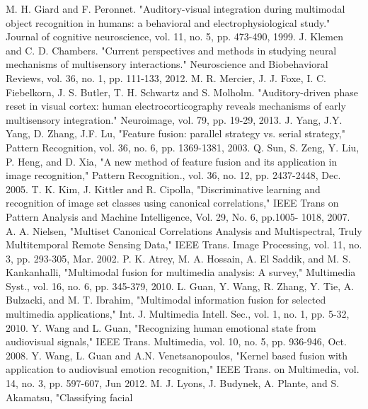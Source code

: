 \documentclass[10pt,journal,compsoc]{IEEEtran}
\begin{document}
\begin{thebibliography}{1}

M. H. Giard and F. Peronnet. "Auditory-visual integration during multimodal object recognition in humans: a behavioral and electrophysiological study." Journal of cognitive neuroscience, vol. 11, no. 5, pp. 473-490, 1999.
J. Klemen and C. D. Chambers. "Current perspectives and methods in studying neural mechanisms of multisensory interactions." Neuroscience and Biobehavioral Reviews, vol. 36, no. 1, pp. 111-133, 2012.
M. R. Mercier, J. J. Foxe, I. C. Fiebelkorn, J. S. Butler, T. H. Schwartz and S. Molholm. "Auditory-driven phase reset in visual cortex: human electrocorticography reveals mechanisms of early multisensory integration." Neuroimage, vol. 79, pp. 19-29, 2013.
J. Yang, J.Y. Yang, D. Zhang, J.F. Lu, "Feature fusion: parallel strategy
vs. serial strategy," Pattern Recognition, vol. 36, no. 6, pp. 1369-1381, 2003.
Q. Sun, S. Zeng, Y. Liu, P. Heng, and D. Xia, "A new method of feature
fusion and its application in image recognition," Pattern Recognition., vol.
36, no. 12, pp. 2437-2448, Dec. 2005.
T. K. Kim, J. Kittler and R. Cipolla, "Discriminative learning and
recognition of image set classes using canonical correlations," IEEE Trans
on Pattern Analysis and Machine Intelligence, Vol. 29, No. 6, pp.1005-
1018, 2007.
A. A. Nielsen, "Multiset Canonical Correlations Analysis and Multispectral,
Truly Multitemporal Remote Sensing Data," IEEE Trans. Image
Processing, vol. 11, no. 3, pp. 293-305, Mar. 2002.
P. K. Atrey, M. A. Hossain, A. El Saddik, and M. S. Kankanhalli,
"Multimodal fusion for multimedia analysis: A survey," Multimedia Syst.,
vol. 16, no. 6, pp. 345-379, 2010.
L. Guan, Y. Wang, R. Zhang, Y. Tie, A. Bulzacki, and M. T. Ibrahim,
"Multimodal information fusion for selected multimedia applications,"
Int. J. Multimedia Intell. Sec., vol. 1, no. 1, pp. 5-32, 2010.
Y. Wang and L. Guan, "Recognizing human emotional state from audiovisual
signals," IEEE Trans. Multimedia, vol. 10, no. 5, pp. 936-946, Oct.
2008.
Y. Wang, L. Guan and A.N. Venetsanopoulos, "Kernel based fusion
with application to audiovisual emotion recognition," IEEE Trans. on
Multimedia, vol. 14, no. 3, pp. 597-607, Jun 2012.
M. J. Lyons, J. Budynek, A. Plante, and S. Akamatsu, "Classifying facial

\end{thebibliography}
\end{document}
